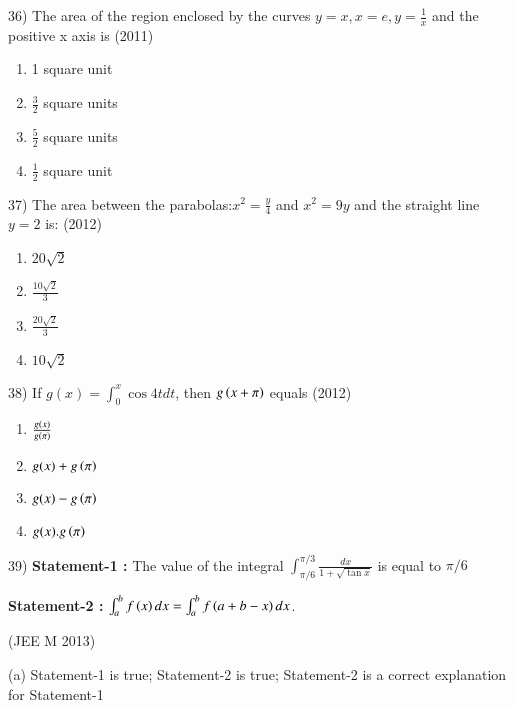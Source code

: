 \documentclass[journal,12pt,twocolumn]{IEEEtran}
\theoremstyle{remark}
\begin{document}
36)
	 The area of the region enclosed by the curves $y=x, x=e, y=\frac{1}{x}$ and the positive x axis is
		\hfill{(2011)}

		\begin{multicols}{2}
			\begin{enumerate}[label=(\alph*)]
				\item 1 square unit
				\item $\frac{3}{2}$ square units
				\item $\frac{5}{2}$ square units
				\item $\frac{1}{2}$ square unit
			\end{enumerate}
		\end{multicols}

37)
	 The area between the parabolas:$x^2=\frac{y}{4}$ and $x^2=9y$ and the straight line $y=2$ is:
		\hfill{(2012)}

		\begin{multicols}{4}
			\begin{enumerate}[label=(\alph*)]
				\item $20\sqrt{2}$
				\item $\frac{10\sqrt{2}}{3}$
				\item $\frac{20\sqrt{2}}{3}$
				\item $10\sqrt{2}$
			\end{enumerate}
		\end{multicols}

38)
	 If $g(x)=\int_0^x\cos 4t dt$, then $g\left(x+\pi\right)$ equals
		\hfill{(2012)}

		\begin{multicols}{2}
			\begin{enumerate}[label=(\alph*)]
				\item $\frac{g(x)}{g\left(\pi\right)}$
				\item $g(x)+g\left(\pi\right)$
				\item $g(x)-g\left(\pi\right)$
				\item $g(x).g\left(\pi\right)$
			\end{enumerate}
		\end{multicols}

39)
	 \textbf{Statement-1 :} The value of the integral $\int_{\pi/6}^{\pi/3}\frac{dx}{1+\sqrt{\tan x}}$ is equal to $\pi/6$

		\textbf{Statement-2 :} $\int_a^bf\left(x\right)dx=\int_a^bf\left(a+b-x\right)dx$.

		\hfill{(JEE M 2013)}
		
		(a) Statement-1 is true; Statement-2 is true; Statement-2 is a correct explanation for Statement-1
\end{document}
